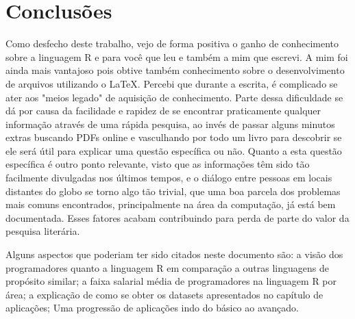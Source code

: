 \chapter{Conclusões}
  \begin{comment}
    Prof. Dr. Ausberto S. Castro Vera
    UENF - CCT - LCMAT - Curso de Ciência da Computação
    Campos, RJ,  2021
    Disciplina: Paradigmas de Linguagens de Programação
    Os problemas enfrentados neste trabalho ...
    O trabalho que foi desenvolvido em forma resumida ...
    Aspectos não considerados que poderiam ser estudados ou úteis para ...
    
    
    \begin{figure}[H]
    	\begin{center}
    		\caption{Aplicação da Linguagem R} \label{ling2}
    		\texttt{[image: R02.png]} \\
    		{\tiny \sf Fonte: O autor }
    	\end{center}
    \end{figure}
  \end{comment}
  
  Como desfecho deste trabalho, vejo de forma positiva o ganho de conhecimento sobre a linguagem R e para você que leu e também a mim que escrevi. A mim foi ainda mais vantajoso pois obtive também conhecimento sobre o desenvolvimento de arquivos utilizando o \LaTeX. Percebi que durante a escrita, é complicado se ater aos "meios legado" de aquisição de conhecimento. Parte dessa dificuldade se dá por causa da facilidade e rapidez de se encontrar praticamente qualquer informação através de uma rápida pesquisa, ao invés de passar alguns minutos extras buscando PDFs online e vasculhando por todo um livro para descobrir se ele será útil para explicar uma questão específica ou não. Quanto a esta questão específica é outro ponto relevante, visto que as informações têm sido tão facilmente divulgadas nos últimos tempos, e o diálogo entre pessoas em locais distantes do globo se torno algo tão trivial, que uma boa parcela dos problemas mais comuns encontrados, principalmente na área da computação, já está bem documentada. Esses fatores acabam contribuindo para perda de parte do valor da pesquisa literária.
  
  Alguns aspectos que poderiam ter sido citados neste documento são: a visão dos programadores quanto a linguagem R em comparação a outras linguagens de propósito similar; a faixa salarial média de programadores na linguagem R por área; a explicação de como se obter os datasets apresentados no capítulo de aplicações; Uma progressão de aplicações indo do básico ao avançado.
  
